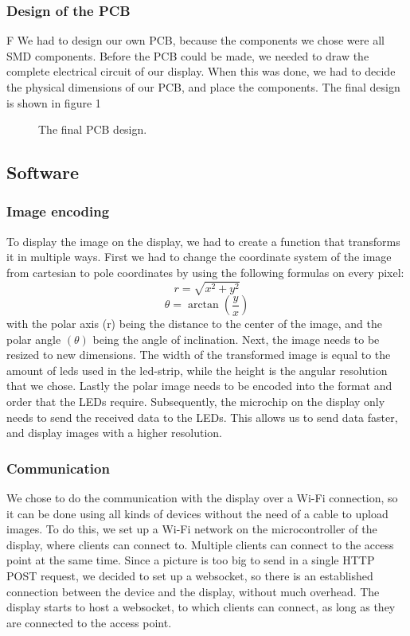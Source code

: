 \documentclass[10pt,twocolumn,letterpaper]{article}
\begin{document}
\subsubsection{Design of the PCB}F
We had to design our own PCB, because the components we chose were all SMD components. Before the PCB could be made, we needed to draw the complete electrical circuit of our display. When this was done, we had to decide the physical dimensions of our PCB, and place the components.
The final design is shown in figure 1

\begin{figure}
\begin{center}
\end{center}
   \caption{The final PCB design.}
\label{fig:short}
\end{figure}

\subsection{Software}
\subsubsection{Image encoding}
To display the image on the display, we had to create a function that transforms it in multiple ways. First we had to change the coordinate system of the image from cartesian to pole coordinates by using the following formulas on every pixel: 
\begin{equation}
r = \sqrt{x^2 + y^2} 
\end{equation}
\begin{equation}
\theta = \arctan\left(\frac{y}{x}\right)
\end{equation}
with the polar axis (r) being the distance to the center of the image, and the polar angle $(\theta)$ being the angle of inclination.
Next, the image needs to be resized to new dimensions. The width of the transformed image is equal to the amount of leds used in the led-strip, while the height is the angular resolution that we chose. 
Lastly the polar image needs to be encoded into the format and order that the LEDs require. Subsequently, the microchip on the display only needs to send the received data to the LEDs.  This allows us to send data faster, and display images with a higher resolution.
\subsubsection{Communication}
We chose to do the communication with the display over a Wi-Fi connection, so it can be done using all kinds of devices without the need of a cable to upload images. 
To do this, we set up a Wi-Fi network on the microcontroller of the display, where clients can connect to. Multiple clients can connect to the access point at the same time.
Since a picture is too big to send in a single HTTP POST request, we decided to set up a websocket, so there is an established connection between the device and the display, without much overhead.
The display starts to host a websocket, to which clients can connect, as long as they are connected to the access point. 
\end{document}
